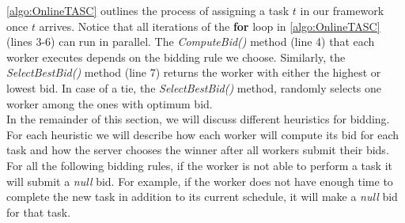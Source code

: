 \cref{algo:OnlineTASC} outlines the process of assigning a task $t$ in our framework once $t$ arrives. Notice that all iterations of the \textbf{for} loop in \cref{algo:OnlineTASC} (lines 3-6) can run in parallel. The \emph{ComputeBid()} method (line 4) that each worker executes depends on the bidding rule we choose. Similarly, the \emph{SelectBestBid()} method (line 7) returns the worker with either the highest or lowest bid. In case of a tie, the \emph{SelectBestBid()} method, randomly selects one worker among the ones with optimum bid.\\

In the remainder of this section, we will discuss different heuristics for bidding. For each heuristic we will describe how each worker will compute its bid for each task and how the server chooses the winner after all workers submit their bids. For all the following bidding rules, if the worker is not able to perform a task it will submit a \textit{null} bid. For example, if the worker does not have enough time to complete the new task in addition to its current schedule, it will make a \textit{null} bid for that task.


